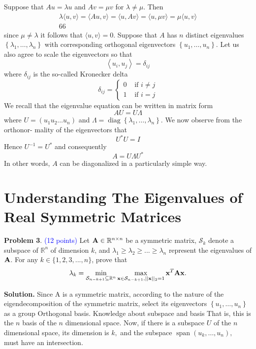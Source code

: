 \documentclass[english,onecolumn]{IEEEtran}
\newcommand{\Rbb}{\mathbb{R}}
\newcommand{\bigS}{\mathcal{S}}
\newcommand{\bA}{{\bf A}}
\newcommand{\bx}{{\bf x}}
\begin{document}
\begin{enumerate}
    Suppose that $A u=\lambda u$ and $A v=\mu v$ for $\lambda \neq \mu .$ Then
    $$
    \begin{array}{c}
    	\lambda\langle u, v\rangle=\langle A u, v\rangle=\langle u, A v\rangle=\langle u, \mu v\rangle=\mu\langle u, v\rangle \\
    	66
    \end{array}
    $$
    since $\mu \neq \lambda$ it follows that $\langle u, v\rangle=0$. Suppose that $A$ has $n$ distinct eigenvalues $\left\{\lambda_{1}, \ldots, \lambda_{n}\right\}$ with corresponding orthogonal
    eigenvectors $\left\{u_{1}, \ldots, u_{n}\right\} .$ Let us also agree to scale the eigenvectors so that
    $$
    \left\langle u_{i}, u_{j}\right\rangle=\delta_{i j}
    $$
    where $\delta_{i j}$ is the so-called Kronecker delta
    $$
    \delta_{i j}=\left\{\begin{array}{ll}
    	0 & \text { if } i \neq j \\
    	1 & \text { if } i=j
    \end{array}\right.
    $$
    We recall that the eigenvalue equation can be written in matrix form
    $$
    A U=U \Lambda
    $$
    where $U=\left(u_{1} u_{2} \ldots u_{n}\right)$ and $\Lambda=\operatorname{diag}\left\{\lambda_{1}, \ldots, \lambda_{n}\right\} .$ We now observe from the orthonor-
    mality of the eigenvectors that
    $$
    U^{*} U=I
    $$
    Hence $U^{-1}=U^{*}$ and consequently
    $$
    A=U \Lambda U^{*}
    $$
    In other words, $A$ can be diagonalized in a particularly simple way.
\end{enumerate}

\clearpage
\section{Understanding The Eigenvalues of Real Symmetric Matrices}
\noindent\textbf{Problem 3}. \textcolor{blue}{(12 points)}
\noindent 
Let $\bA\in \Rbb^{n\times n}$ be a symmetric matrix, $\bigS_k$ denote a subspace of $\Rbb^n$ of dimension $k$, and $\lambda_1\geq \lambda_2\geq...\geq \lambda_n$ represent the eigenvalues of $\bA$. 
For any $k\in\{1,2,3,...,n\}$, prove that \[\lambda_k=\min\limits_{\bigS_{n-k+1}\subseteq \Rbb^n}\max\limits_{\bx\in\bigS_{n-k+1},||\bx||_2=1} \bx^T\bA\bx.\]

\noindent
\textbf{Solution.}
Since A is a symmetric matrix, according to the nature of the eigendecomposition of the symmetric matrix, select its eigenvectors $\left\{u_{1}, \ldots, u_{n}\right\}$ as a group Orthogonal basis. Knowledge about subspace and basis
That is, this is the $n$ basis of the $n$ dimensional space.
Now, if there is a subspace $U$ of the $n$ dimensional space, its dimension is $k,$ and the subspace $\operatorname{span}\left(u_{k}, \ldots, u_{n}\right ), \quad$ must have an intersection. 
\end{document}
